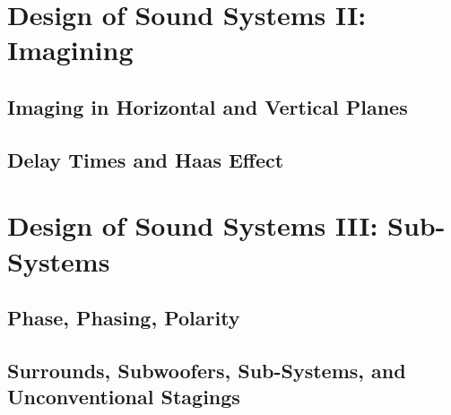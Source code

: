\documentclass[a4paper]{article}
\begin{document}
\section{Design of Sound Systems II: Imagining}
\subsection{Imaging in Horizontal and Vertical Planes}
\subsection{Delay Times and Haas Effect}

\section{Design of Sound Systems III: Sub-Systems}
\subsection{Phase, Phasing, Polarity}
\subsection{Surrounds, Subwoofers, Sub-Systems, and Unconventional Stagings}
\end{document}
